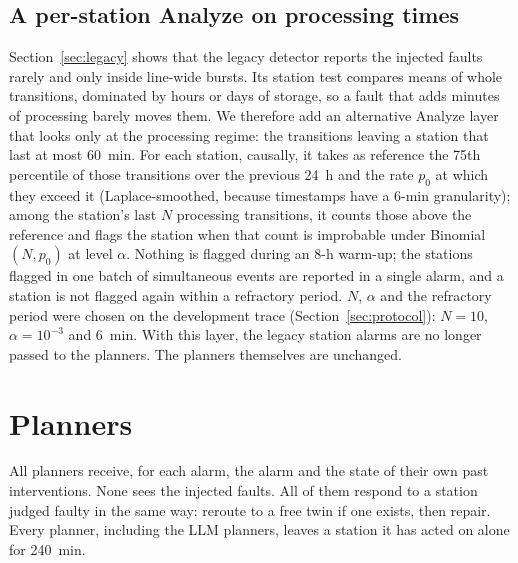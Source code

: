 \documentclass[preprint,11pt]{elsarticle}
\begin{document}
\subsection{A per-station Analyze on processing times}
\label{sec:perstation}
Section~\ref{sec:legacy} shows that the legacy detector reports the injected faults rarely and only inside line-wide bursts. Its station test compares means of whole transitions, dominated by hours or days of storage, so a fault that adds minutes of processing barely moves them. We therefore add an alternative Analyze layer that looks only at the processing regime: the transitions leaving a station that last at most 60~min. For each station, causally, it takes as reference the 75th percentile of those transitions over the previous 24~h and the rate $p_0$ at which they exceed it (Laplace-smoothed, because timestamps have a 6-min granularity); among the station's last $N$ processing transitions, it counts those above the reference and flags the station when that count is improbable under Binomial$(N, p_0)$ at level $\alpha$. Nothing is flagged during an 8-h warm-up; the stations flagged in one batch of simultaneous events are reported in a single alarm, and a station is not flagged again within a refractory period. $N$, $\alpha$ and the refractory period were chosen on the development trace (Section~\ref{sec:protocol}): $N=10$, $\alpha=10^{-3}$ and 6~min. With this layer, the legacy station alarms are no longer passed to the planners. The planners themselves are unchanged.

\section{Planners}
\label{sec:planners}

All planners receive, for each alarm, the alarm and the state of their own past interventions. None sees the injected faults. All of them respond to a station judged faulty in the same way: reroute to a free twin if one exists, then repair. Every planner, including the LLM planners, leaves a station it has acted on alone for 240~min.
\end{document}
